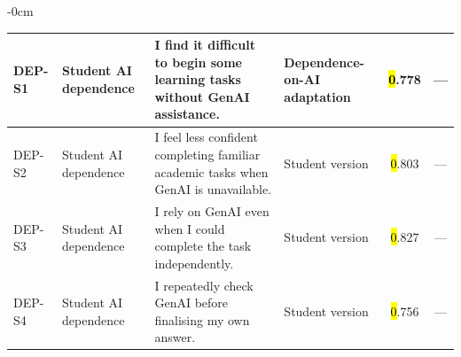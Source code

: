 \documentclass[sustainability,article,accept,moreauthors]{Definitions/mdpi}
\begin{document}
\begin{table}[H]
\begin{adjustwidth}{-\extralength}{0cm}
\begin{tabular}{p{1.2cm}p{4cm}p{5cm}p{4cm}cc}
DEP-S1 & Student AI dependence & I find it difficult to begin some learning tasks without GenAI assistance. & Dependence-on-AI adaptation~\cite{morales2024} &\hl{0}.778 & --- \\\midrule
DEP-S2 & Student AI dependence & I feel less confident completing familiar academic tasks when GenAI is unavailable. & Student version &\hl{0}.803 & --- \\\midrule
DEP-S3 & Student AI dependence & I rely on GenAI even when I could complete the task independently. & Student version &\hl{0}.827 & --- \\\midrule
DEP-S4 & Student AI dependence & I repeatedly check GenAI before finalising my own answer. & Student version &\hl{0}.756 & --- \\


\bottomrule
\end{tabular}
\end{adjustwidth}
\end{table}
\end{document}
